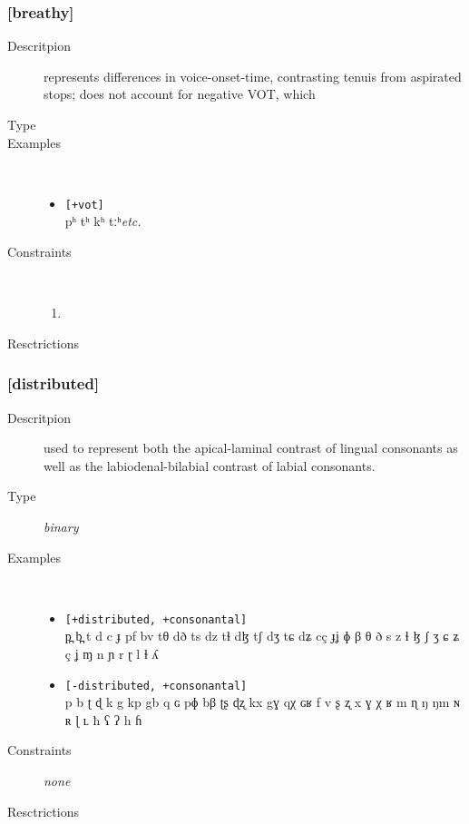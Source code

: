 \documentclass[10pt,letterpaper]{article}
\begin{document}
\subsubsection{[breathy]}
\label{ssub:feature_breathy}

\begin{description}
\item[Descritpion] represents differences in voice-onset-time, contrasting tenuis from aspirated stops; does not account for negative VOT, which
\item[Type]
\item[Examples]\
  \begin{itemize}
    \item \texttt{[+vot]}\\
    pʰ tʰ kʰ tːʰ\emph{etc.}
  \end{itemize}
\item[Constraints]\
  \begin{enumerate}
    \item
  \end{enumerate}
\item[Resctrictions]
\end{description}

\subsubsection{[distributed]}
\label{ssub:feature_distributed}

\begin{description}
\item[Descritpion] used to represent both the apical-laminal contrast of lingual consonants as well as the labiodenal-bilabial contrast of labial consonants.
\item[Type] \emph{binary}
\item[Examples]\
  \begin{itemize} 
    \item \texttt{[+distributed, +consonantal]}\\
    p̪ b̪ t d c ɟ pf bv tθ dð ts dz tɬ dɮ tʃ dʒ tɕ dʑ cç ɟʝ ɸ β θ ð s z ɬ ɮ ʃ ʒ ɕ ʑ ç ʝ ɱ n ɲ r ɽ l ɫ ʎ 
    \item \texttt{[-distributed, +consonantal]}\\
    p b ʈ ɖ k g kp gb q ɢ pɸ bβ ʈʂ ɖʐ kx gɣ qχ ɢʁ f v ʂ ʐ x ɣ χ ʁ m ɳ ŋ ŋm ɴ ʀ ɭ ʟ ħ ʕ ʔ h ɦ 
  \end{itemize}
\item[Constraints] \emph{none}
\item[Resctrictions]  %
\end{description}
\end{document}
